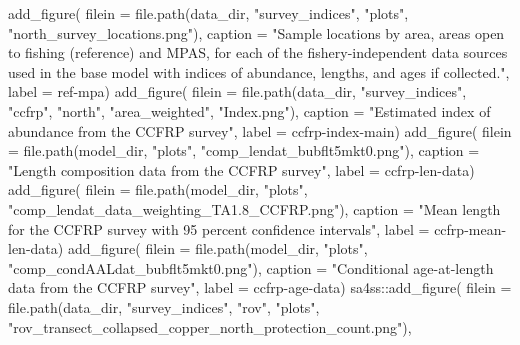 \documentclass[
  letterpaper,
]{article}
\newenvironment{Shaded}{\begin{snugshade}}{\end{snugshade}}
\newcommand{\AttributeTok}[1]{\textcolor[rgb]{0.77,0.63,0.00}{#1}}
\newcommand{\FunctionTok}[1]{\textcolor[rgb]{0.00,0.00,0.00}{#1}}
\newcommand{\NormalTok}[1]{#1}
\newcommand{\SpecialCharTok}[1]{\textcolor[rgb]{0.00,0.00,0.00}{#1}}
\newcommand{\StringTok}[1]{\textcolor[rgb]{0.31,0.60,0.02}{#1}}
\begin{document}
\begin{Shaded}
\begin{Highlighting}[]
\FunctionTok{add\_figure}\NormalTok{(}
\AttributeTok{filein =} \FunctionTok{file.path}\NormalTok{(data\_dir, }\StringTok{"survey\_indices"}\NormalTok{, }\StringTok{"plots"}\NormalTok{, }\StringTok{"north\_survey\_locations.png"}\NormalTok{), }
\AttributeTok{caption =} \StringTok{"Sample locations by area, areas open to fishing (reference) and MPAS, for each of the fishery{-}independent data sources used in the base model with indices of abundance, lengths, and ages if collected."}\NormalTok{,}
\AttributeTok{label =} \StringTok{\textquotesingle{}ref{-}mpa\textquotesingle{}}\NormalTok{)}
\FunctionTok{add\_figure}\NormalTok{(}
\AttributeTok{filein =} \FunctionTok{file.path}\NormalTok{(data\_dir, }\StringTok{"survey\_indices"}\NormalTok{, }\StringTok{"ccfrp"}\NormalTok{, }\StringTok{"north"}\NormalTok{, }\StringTok{"area\_weighted"}\NormalTok{, }\StringTok{"Index.png"}\NormalTok{), }
\AttributeTok{caption =} \StringTok{"Estimated index of abundance from the CCFRP survey"}\NormalTok{,}
\AttributeTok{label =} \StringTok{\textquotesingle{}ccfrp{-}index{-}main\textquotesingle{}}\NormalTok{)}
\FunctionTok{add\_figure}\NormalTok{(}
\AttributeTok{filein =} \FunctionTok{file.path}\NormalTok{(model\_dir, }\StringTok{"plots"}\NormalTok{, }\StringTok{"comp\_lendat\_bubflt5mkt0.png"}\NormalTok{), }
\AttributeTok{caption =} \StringTok{"Length composition data from the CCFRP survey"}\NormalTok{,}
\AttributeTok{label =} \StringTok{\textquotesingle{}ccfrp{-}len{-}data\textquotesingle{}}\NormalTok{)}
\FunctionTok{add\_figure}\NormalTok{(}
\AttributeTok{filein =} \FunctionTok{file.path}\NormalTok{(model\_dir, }\StringTok{"plots"}\NormalTok{, }\StringTok{"comp\_lendat\_data\_weighting\_TA1.8\_CCFRP.png"}\NormalTok{), }
\AttributeTok{caption =} \StringTok{"Mean length for the CCFRP survey with 95 percent confidence intervals"}\NormalTok{,}
\AttributeTok{label =} \StringTok{\textquotesingle{}ccfrp{-}mean{-}len{-}data\textquotesingle{}}\NormalTok{)}
\FunctionTok{add\_figure}\NormalTok{(}
\AttributeTok{filein =} \FunctionTok{file.path}\NormalTok{(model\_dir, }\StringTok{"plots"}\NormalTok{, }\StringTok{"comp\_condAALdat\_bubflt5mkt0.png"}\NormalTok{), }
\AttributeTok{caption =} \StringTok{"Conditional age{-}at{-}length data from the CCFRP survey"}\NormalTok{,}
\AttributeTok{label =} \StringTok{\textquotesingle{}ccfrp{-}age{-}data\textquotesingle{}}\NormalTok{)}
\NormalTok{sa4ss}\SpecialCharTok{::}\FunctionTok{add\_figure}\NormalTok{(}
\AttributeTok{filein =} \FunctionTok{file.path}\NormalTok{(data\_dir, }\StringTok{"survey\_indices"}\NormalTok{, }\StringTok{"rov"}\NormalTok{, }\StringTok{"plots"}\NormalTok{, }\StringTok{"rov\_transect\_collapsed\_copper\_north\_protection\_count.png"}\NormalTok{), }

\end{Highlighting}
\end{Shaded}
\end{document}
